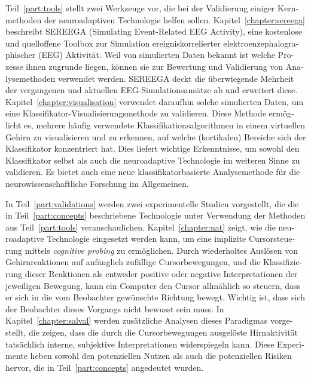 \begin{otherlanguage}{ngerman}
Teil~\ref{part:tools} stellt zwei Werkzeuge vor, die bei der Validierung einiger Kernmethoden der neuroadaptiven Technologie helfen sollen. Kapitel~\ref{chapter:sereega} beschreibt SEREEGA (Simulating Event-Related EEG Activity), eine kostenlose und quelloffene Toolbox zur Simulation ereigniskorrelierter elektroenzephalographischer (EEG) Aktivität. Weil von simulierten Daten bekannt ist welche Prozesse ihnen zugrunde liegen, können sie zur Bewertung und Validierung von Analysemethoden verwendet werden. SEREEGA deckt die überwiegende Mehrheit der vergangenen und aktuellen EEG-Simulationsansätze ab und erweitert diese. Kapitel~\ref{chapter:visualisation} verwendet daraufhin solche simulierten Daten, um eine Klassifikator-Visualisierungsmethode zu validieren. Diese Methode ermöglicht es, mehrere häufig verwendete Klassifikationsalgorithmen in einem virtuellen Gehirn zu visualisieren und zu erkennen, auf welche (kortikalen) Bereiche sich der Klassifikator konzentriert hat. Dies liefert wichtige Erkenntnisse, um sowohl den Klassifikator selbst als auch die neuroadaptive Technologie im weiteren Sinne zu validieren. Es bietet auch eine neue klassifikatorbasierte Analysemethode für die neurowissenschaftliche Forschung im Allgemeinen.

In Teil~\ref{part:validations} werden zwei experimentelle Studien vorgestellt, die die in Teil~\ref{part:concepts} beschriebene Technologie unter Verwendung der Methoden aus Teil~\ref{part:tools} veranschaulichen. Kapitel~\ref{chapter:nat} zeigt, wie die neuroadaptive Technologie eingesetzt werden kann, um eine implizite Cursorsteuerung mittels \emph{cognitive probing} zu ermöglichen. Durch wiederholtes Auslösen von Gehirnreaktionen auf anfänglich zufällige Cursorbewegungen, und die Klassifizierung dieser Reaktionen als entweder positive oder negative Interpretationen der jeweiligen Bewegung, kann ein Computer den Cursor allmählich so steuern, dass er sich in die vom Beobachter gewünschte Richtung bewegt. Wichtig ist, dass sich der Beobachter dieses Vorgangs nicht bewusst sein muss. In Kapitel~\ref{chapter:salval} werden zusätzliche Analysen dieses Paradigmas vorgestellt, die zeigen, dass die durch die Cursorbewegungen ausgelöste Hirnaktivität tatsächlich interne, subjektive Interpretationen widerspiegeln kann. Diese Experimente heben sowohl den potenziellen Nutzen als auch die potenziellen Risiken hervor, die in Teil~\ref{part:concepts} angedeutet wurden.
\end{otherlanguage}
